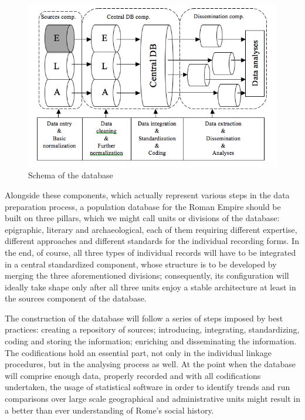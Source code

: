 \documentclass[amsthm,ebook]{saparticle}
\begin{document}
\begin{figure}[!hbp]
\centering
\includegraphics[width=\columnwidth]{graph.png}
\caption{Schema of the database}
\label{fig:schemadatabase}
\end{figure}

Alongside these components, which actually represent various steps in the data preparation process, a population
database for the Roman Empire should be built on three pillars, which we might call units or divisions of the database:
epigraphic, literary and archaeological, each of them requiring different expertise, different approaches and different
standards for the individual recording forms. In the end, of course, all three types of individual records will have to
be integrated in a central standardized component, whose structure is to be developed by merging the three
aforementioned divisions; consequently, its configuration will ideally take shape only after all three units enjoy a
stable architecture at least in the sources component of the database.

\newpage
The construction of the database will follow a series of steps imposed by best practices: creating a repository of
sources; introducing, integrating, standardizing, coding and storing the information; enriching and disseminating the
information. The codifications hold an essential part, not only in the individual linkage procedures, but in the
analysing process as well. At the point when the database will comprise enough data, properly recorded and with all
codifications undertaken, the usage of statistical software in order to identify trends and run comparisons over large
scale geographical and administrative units might result in a better than ever understanding of Rome’s
social history.
\end{document}

